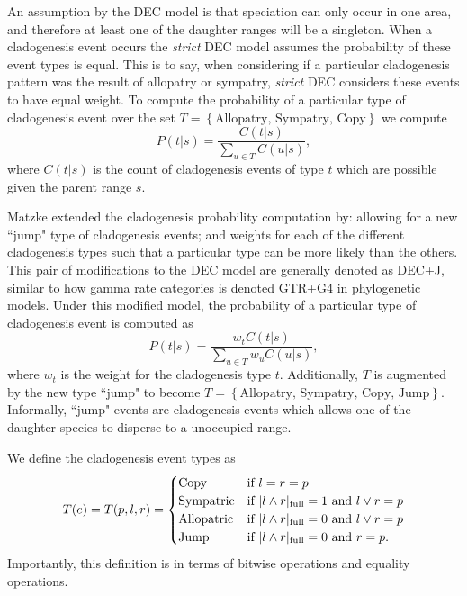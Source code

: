 \documentclass{article}
\begin{document}
An assumption by the DEC model is that speciation can only occur in one area,
and therefore at least one of the daughter ranges will be a singleton.
When a cladogenesis event occurs the \textit{strict} DEC model assumes the
probability of these event types is equal.
This is to say, when considering if a particular cladogenesis pattern was the
result of allopatry or sympatry, \textit{strict} DEC considers these events to
have equal weight.
To compute the probability of a particular type of cladogenesis event over the
set \(T = \left\{\text{Allopatry, Sympatry, Copy}\right\}\) we compute
\[
	P(t |
	s) = \frac{C(t | s)}{\sum_{u \in T} C(u | s)},
\]
where \( C(t|s) \) is the
count of cladogenesis events of type $ t $ which are possible given the parent
range \( s \).

Matzke\cite{ModelSelectionMatzke2014} extended the cladogenesis probability
computation by: allowing for a new ``jump" type of cladogenesis events; and
weights for each of the different cladogenesis types such that a particular
type can be more likely than the others.
This pair of modifications to the DEC model are generally denoted as DEC+J,
similar to how gamma rate categories is denoted GTR+G4 in phylogenetic models.
Under this modified model, the probability of a particular type of cladogenesis
event is computed as
\begin{equation}
	P(t | s) = \frac{w_t C(t | s)}{\sum_{u \in T} w_u C(u |
		s)},
\end{equation}
where $w_t$ is the weight for the cladogenesis type $t$.
Additionally, $T$ is augmented by the new type ``jump" to become \(T =
\left\{\text{Allopatry, Sympatry, Copy, Jump}\right\} \).
Informally, ``jump" events are cladogenesis events which allows one of the
daughter species to disperse to a unoccupied range.

We define the cladogenesis event types as
\begin{equation}
T(e) = T(p, l, r) = 
\begin{cases}
  \text{Copy} & \text{if }l = r = p \\ 
  \text{Sympatric} & \text{if } |l \land r|_\text{full} = 1 \text{ and } l \lor r = p \\ 
  \text{Allopatric} & \text{if } |l \land r|_\text{full} = 0 \text{ and } l \lor r = p   \\ 
  \text{Jump} & \text{if } |l \land r|_\text{full} = 0 \text{ and } r = p. \\ 
\end{cases}
\label{eq:clad-test}
\end{equation}
Importantly, this definition is in terms of bitwise operations and equality
operations.
\end{document}
